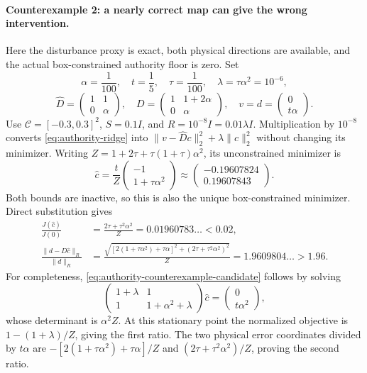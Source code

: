 \paragraph{Counterexample 2: a nearly correct map can give the wrong intervention.}
Here the disturbance proxy is exact, both physical directions are available,
and the actual box-constrained authority floor is zero. Set
\[
 \alpha=\frac1{100},\quad t=\frac15,\quad \tau=\frac1{100},
 \quad \lambda=\tau\alpha^2=10^{-6},
\]
\[
 \widehat D=\begin{pmatrix}1&1\\0&\alpha\end{pmatrix},\quad
 D=\begin{pmatrix}1&1+2\alpha\\0&\alpha\end{pmatrix},\quad
 v=d=\begin{pmatrix}0\\t\alpha\end{pmatrix}.
\]
Use $\mathcal C=[-0.3,0.3]^2$, $S=0.1I$, and
$R=10^{-8}I=0.01\lambda I$. Multiplication by $10^{-8}$ converts
\eqref{eq:authority-ridge} into
$\|v-\widehat D c\|_2^2+\lambda\|c\|_2^2$ without changing its minimizer.
Writing $Z=1+2\tau+\tau(1+\tau)\alpha^2$, its unconstrained minimizer is
\begin{equation}
 \widehat c=\frac{t}{Z}
             \begin{pmatrix}-1\\1+\tau\alpha^2\end{pmatrix}
 \approx\begin{pmatrix}-0.19607824\\0.19607843\end{pmatrix}.
 \label{eq:authority-counterexample-candidate}
\end{equation}
Both bounds are inactive, so this is also the unique box-constrained
minimizer. Direct substitution gives
\begin{align}
 \frac{J(\widehat c)}{J(0)}
 &=\frac{2\tau+\tau^2\alpha^2}{Z}
   =0.01960783\ldots<0.02,\\
 \frac{\|d-D\widehat c\|_R}{\|d\|_R}
 &=\frac{\sqrt{[2(1+\tau\alpha^2)+\tau\alpha]^2
                     +(2\tau+\tau^2\alpha^2)^2}}{Z}
   =1.9609804\ldots>1.96.
 \label{eq:authority-counterexample-harm}
\end{align}
For completeness, \eqref{eq:authority-counterexample-candidate} follows
by solving
\[
 \begin{pmatrix}1+\lambda&1\\1&1+\alpha^2+\lambda\end{pmatrix}
 \widehat c=\begin{pmatrix}0\\t\alpha^2\end{pmatrix},
\]
whose determinant is $\alpha^2Z$. At this stationary point the normalized
objective is $1-(1+\lambda)/Z$, giving the first ratio. The two physical
error coordinates divided by $t\alpha$ are
$-[2(1+\tau\alpha^2)+\tau\alpha]/Z$ and
$(2\tau+\tau^2\alpha^2)/Z$, proving the second ratio.

